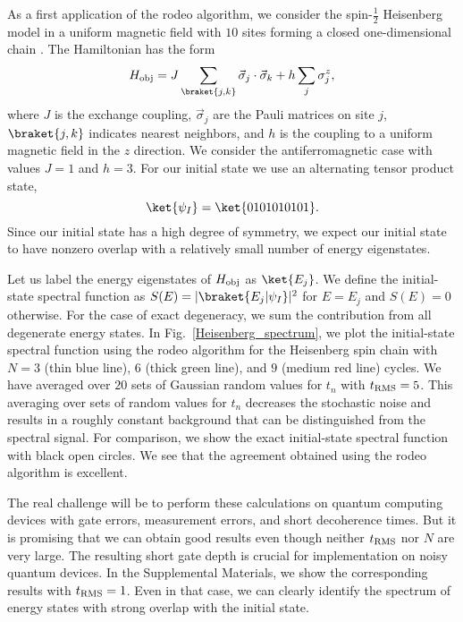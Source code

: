 As a first application of the rodeo algorithm, we consider the spin-$\tfrac{1}{2}$ Heisenberg model in a uniform magnetic field with $10$ sites forming a closed one-dimensional chain \cite{Heisenberg:1928}.  The Hamiltonian has the form
\begin{equation}
    H_{\rm obj} = J \sum_{\braket{j,k}} \vec{\sigma}_j\cdot \vec{\sigma}_k + h \sum_{j} \sigma^z_j,
\end{equation}
where $J$ is the exchange coupling, $\vec{\sigma}_j$ are the Pauli matrices on site $j$, $\braket{j,k}$ indicates nearest neighbors, and $h$ is the coupling to a uniform magnetic field in the $z$ direction.  We consider the antiferromagnetic case with values $J=1$ and $h=3$. For our initial state we use an alternating tensor product state,
\begin{equation}
    \ket{\psi_I} = \ket{0101010101}.
\end{equation}
Since our initial state has a high degree of symmetry, we expect our initial state to have nonzero overlap with a relatively small number of energy eigenstates.

Let us label the energy eigenstates of $H_{\rm obj}$ as $\ket{E_j}$. We define the initial-state spectral function as $S(E)=|\braket{E_j|\psi_I}|^2$ for $E=E_j$ and $S(E)=0$ otherwise.  For the case of exact degeneracy, we sum the contribution from all degenerate energy states.  In Fig.~\ref{Heisenberg_spectrum}, we plot the initial-state spectral function using the rodeo algorithm for the Heisenberg spin chain with $N=3$ (thin blue line), $6$ (thick green line), and $9$ (medium red line) cycles. We have averaged over $20$ sets of Gaussian random values for $t_n$ with $t_{\rm RMS}=5$.  This averaging over sets of random values for $t_n$ decreases the stochastic noise and results in a roughly constant background that can be distinguished from the spectral signal.  For comparison, we show the exact initial-state spectral function with black open circles.  We see that the agreement obtained using the rodeo algorithm is excellent.  

The real challenge will be to perform these calculations on quantum computing devices with gate errors, measurement errors, and short decoherence times.  But it is promising that we can obtain good results even though neither $t_{\rm RMS}$ nor $N$ are very large.  The resulting short gate depth is crucial for implementation on noisy quantum devices.  In the Supplemental Materials, we show the corresponding results with $t_{\rm RMS}=1$.  Even in that case, we can clearly identify the spectrum of energy states with strong overlap with the initial state.

